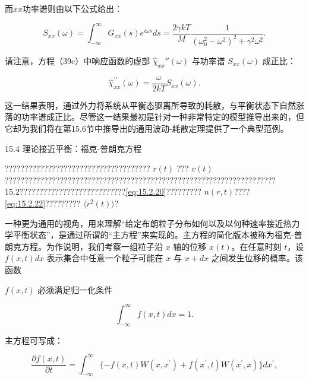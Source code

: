 而\(xx\)功率谱则由以下公式给出：

\begin{equation}\tag{15.3.48}\label{eq:15.3.48}
S _ { x x } ( \omega ) = \int _ { - \infty } ^{\infty} G _ { x x } ( s ) e ^{i \omega s} d s = \frac { 2 \gamma k T } { M } \frac { 1 } { \left( \omega _ { 0 } ^{2} - \omega ^{2} \right) ^{2} + \gamma ^{2} \omega ^{2} } .
\end{equation}

请注意，方程（39c）中响应函数的虚部 \(\hat{\chi}_{xx}''(\omega)\) 与功率谱 \(S_{xx}(\omega)\) 成正比：

\begin{equation}\tag{15.3.49}\label{eq:15.3.49}
\hat { \chi } _ { x x } ^{\prime \prime} ( \omega ) = \frac { \omega } { 2 k T } S _ { x x } ( \omega ) .
\end{equation}

这一结果表明，通过外力将系统从平衡态驱离所导致的耗散，与平衡状态下自然涨落的功率谱成正比。尽管这一结果最初是针对一种非常特定的模型推导出来的，但它却为我们将在第15.6节中推导出的通用波动-耗散定理提供了一个典型范例。

15.4 理论接近平衡：福克-普朗克方程

????????????????????????????????????? \(r(t)\) ??? \(v(t)\) ?????????????????????????????????????????????????????????????????????15.2???????????????????????????\autoref{eq:15.2.20}????????? \(n(r,t)\)????\autoref{eq:15.2.22}????????? \(\langle r^2(t) \rangle\)?

一种更为通用的视角，用来理解``给定布朗粒子分布如何以及以何种速率接近热力学平衡状态''，是通过所谓的``主方程''来实现的。主方程的简化版本被称为福克-普朗克方程。为作说明，我们考察一组粒子沿 \(x\) 轴的位移 \(x(t)\)。在任意时刻 \(t\)，设 \(f(x,t)dx\) 表示集合中任意一个粒子可能在 \(x\) 与 \(x+dx\) 之间发生位移的概率。该函数

\(f(x,t)\) 必须满足归一化条件

\begin{equation}\tag{15.4.1}\label{eq:15.4.1}
\int _ { - \infty } ^{\infty} f ( x , t ) d x = 1 .
\end{equation}

主方程可写成：

\begin{equation}\tag{15.4.2}\label{eq:15.4.2}
\frac { \partial f ( x , t ) } { \partial t } = \int _ { - \infty } ^{\infty} \{ - f ( x , t ) W ( x , x ^{\prime} ) + f ( x ^{\prime} , t ) W ( x ^{\prime} , x ) \} d x ^{\prime} ,
\end{equation}

